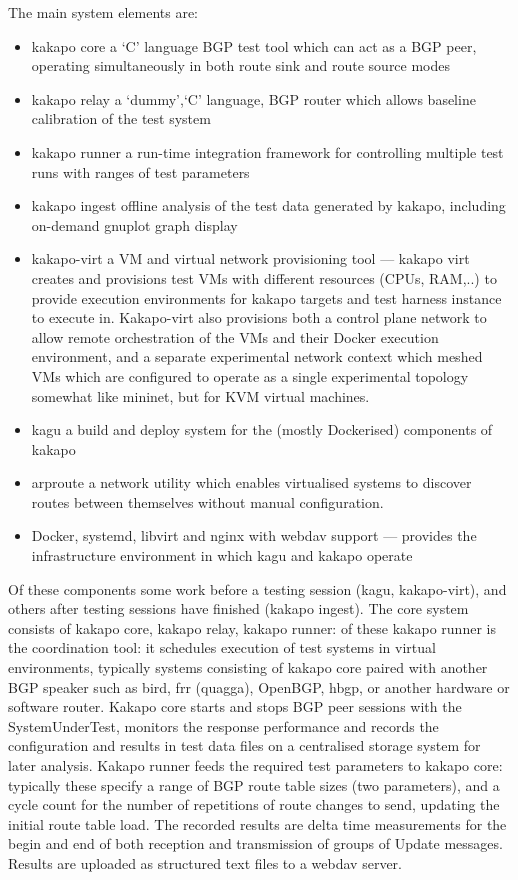 The main system elements are:

\begin{itemize}
	\item kakapo core  a ‘C’ language BGP test tool which can act
	      as a BGP peer, operating simultaneously in both route sink and route source
	      modes
	\item kakapo relay  a ‘dummy’,‘C’ language, BGP router which allows
	      baseline calibration of the test system
	\item kakapo runner  a run-time
	      integration framework for controlling multiple test runs with ranges of
	      test parameters
	\item kakapo ingest  offline analysis of the test data
	      generated by kakapo, including on-demand gnuplot graph display
	\item
	      kakapo-virt  a VM and virtual network provisioning tool --- kakapo virt
	      creates and provisions test VMs with different resources (CPUs, RAM,..) to
	      provide execution environments for kakapo targets and test harness instance
	      to execute in.  Kakapo-virt also provisions both a control plane network to
	      allow remote orchestration of the VMs and their Docker execution
	      environment, and a separate experimental network context which meshed VMs
	      which are configured to operate as a single experimental topology
	      somewhat like mininet, but for KVM virtual machines.

	\item kagu a build and deploy system for the (mostly Dockerised) components of kakapo
	\item arproute a network utility which enables virtualised systems to discover routes between themselves without manual configuration.
	\item Docker, systemd, libvirt and nginx with webdav support --- provides the infrastructure environment in which kagu and kakapo operate
\end{itemize}

Of these components some work before a testing session (kagu, kakapo-virt), and
others after testing sessions have finished (kakapo ingest).  The core system
consists of kakapo core, kakapo relay, kakapo runner: of these kakapo runner
is the coordination tool: it schedules execution of test systems in virtual
environments, typically systems consisting of kakapo core paired with another
BGP speaker such as bird, frr (quagga), OpenBGP, hbgp, or another hardware or
software router.  Kakapo core starts and stops BGP peer sessions with the
SystemUnderTest, monitors the response performance and records the
configuration and results in test data files on a centralised storage system
for later analysis.  Kakapo runner feeds the required test parameters to kakapo
core: typically these specify a range of BGP route table sizes (two
parameters), and a cycle count for the number of repetitions of route changes
to send, updating the initial route table load.  The recorded results are delta
time measurements for the begin and end of both reception and transmission of
groups of Update messages.  Results are uploaded as structured text files to
a webdav server.

